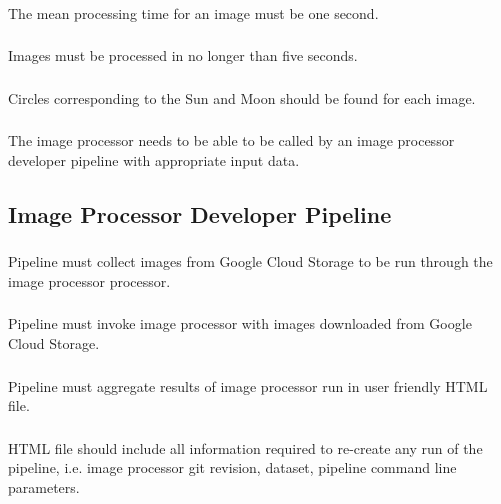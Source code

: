 \documentclass[10pt, onecolumn, draftclsnofoot, letterpaper, compsoc]{IEEEtran}
\begin{document}
\subsubsection{}

The mean processing time for an image must be one second.

\subsubsection{}

Images must be processed in no longer than five seconds.

\subsubsection{}

Circles corresponding to the Sun and Moon should be found for each image.

\subsubsection{}

The image processor needs to be able to be called by an image processor developer
pipeline with appropriate input data. \\

\subsection{Image Processor Developer Pipeline}

	\subsubsection{}
	Pipeline must collect images from Google Cloud Storage to be run through the image
	processor processor.

	\subsubsection{}
	Pipeline must invoke image processor with images downloaded from Google Cloud
	Storage.

	\subsubsection{}
	Pipeline must aggregate results of image processor run in user friendly HTML file.

	\subsubsection{}
	HTML file should include all information required to re-create any run of the pipeline,
	i.e. image processor git revision, dataset, pipeline command line parameters.
\end{document}
